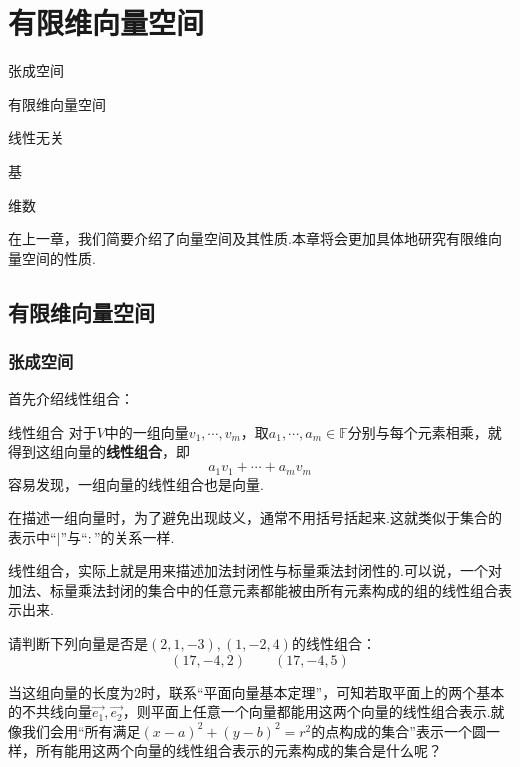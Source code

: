 \documentclass[lang=cn, zihao=5]{elegantbook}
\newcommand{\xl}[1]{\overrightarrow{#1}}
\newcommand{\F}{\mathbb{F}}
\begin{document}
\chapter{有限维向量空间}

\begin{introduction}
	\item 张成空间
	\item 有限维向量空间
	\item 线性无关
	\item 基
	\item 维数
\end{introduction}

在上一章，我们简要介绍了向量空间及其性质.本章将会更加具体地研究有限维向量空间的性质.

\section{有限维向量空间}

\subsection{张成空间}

首先介绍线性组合：

\begin{definition}{线性组合}
	对于$V$中的一组向量$v_1, \cdots ,v_m$，取$a_1, \cdots ,a_m \in \F$分别与每个元素相乘，就得到这组向量的\textbf{线性组合}，即$$a_1v_1 + \cdots + a_mv_m$$
	容易发现，一组向量的线性组合也是向量.
\end{definition}
\begin{remark}
	在描述一组向量时，为了避免出现歧义，通常不用括号括起来.这就类似于集合的表示中“$|$”与“$:$”的关系一样.
\end{remark}
\begin{remark}
	线性组合，实际上就是用来描述加法封闭性与标量乘法封闭性的.可以说，一个对加法、标量乘法封闭的集合中的任意元素都能被由所有元素构成的组的线性组合表示出来.
\end{remark}

\begin{example}
	请判断下列向量是否是$(2,1,-3),(1,-2,4)$的线性组合：
	$$(17,-4,2) \qquad (17,-4,5)$$
\end{example}

当这组向量的长度为$2$时，联系“平面向量基本定理”，可知若取平面上的两个基本的不共线向量$\xl{e_1},\xl{e_2}$，则平面上任意一个向量都能用这两个向量的线性组合表示.就像我们会用“所有满足$(x-a)^2+(y-b)^2=r^2$的点构成的集合”表示一个圆一样，所有能用这两个向量的线性组合表示的元素构成的集合是什么呢？
\end{document}
